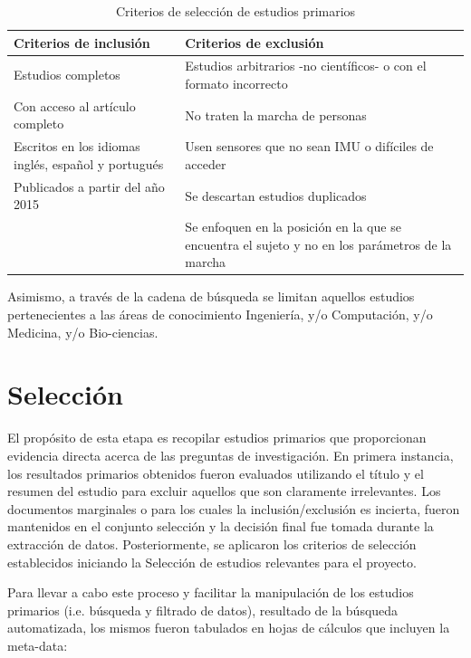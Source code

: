 \begin{table}[H] 
\caption{Criterios de selección de estudios primarios}
\centering
\hspace*{-1cm}%
\begin{tabular}{|p{7cm}|p{8cm}|}
\hline
\textbf{Criterios de inclusión} & \textbf{Criterios de exclusión}\\ \hline
Estudios completos & Estudios arbitrarios -no científicos- o con el formato incorrecto\\ \hline
Con acceso al artículo completo & No traten la marcha de personas\\ \hline
Escritos en los idiomas inglés, español y portugués  & Usen sensores que no sean IMU o difíciles de acceder\\ \hline
Publicados a partir del año 2015 & Se descartan estudios duplicados\\ \hline
    & Se enfoquen en la posición en la que se encuentra el sujeto y no en los parámetros de la marcha \\\hline
\end{tabular}
\hspace*{-1cm}
\label{TAB: criterios}
\end{table}

Asimismo, a través de la cadena de búsqueda se limitan aquellos estudios pertenecientes a las áreas de conocimiento Ingeniería, y/o Computación, y/o Medicina, y/o Bio-ciencias.

\section{Selección}

El propósito de esta etapa es recopilar estudios primarios que proporcionan evidencia directa acerca de las preguntas de investigación.
En primera instancia, los resultados primarios obtenidos fueron evaluados utilizando el título y el resumen del estudio para excluir aquellos que son claramente irrelevantes. Los documentos marginales o para los cuales la inclusión/exclusión es incierta, fueron mantenidos en el conjunto selección y la decisión final fue tomada durante la extracción de datos. Posteriormente, se aplicaron los criterios de selección establecidos iniciando la Selección de estudios relevantes para el proyecto. 

Para llevar a cabo este proceso y facilitar la manipulación de los estudios primarios (i.e. búsqueda y filtrado de datos), resultado de la búsqueda automatizada, los mismos fueron tabulados en hojas de cálculos que incluyen la meta-data:

